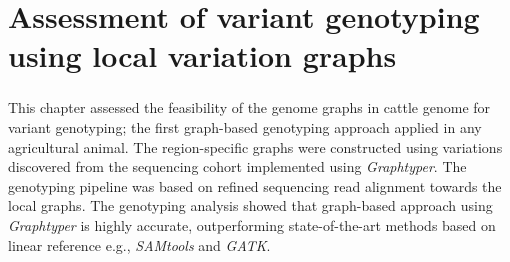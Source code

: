 \documentclass[11 pt, a4paper, notitlepage, twoside]{report}
\begin{document}
\iftwoside
\cleardoublepage
\newpage
\fi


\chapter[Feasibility of the bovine genome graphs]{\LARGE{Assessment of variant genotyping using local variation graphs}}
\label{chap:locgraph}
\subsection*{}
\onehalfspacing
\normalsize
This chapter assessed the feasibility of the genome graphs in cattle genome for variant genotyping; the first graph-based genotyping approach applied in any agricultural animal. The region-specific graphs were constructed using variations discovered from the sequencing cohort implemented using \emph{Graphtyper}. The genotyping pipeline was based on refined sequencing read alignment towards the local graphs. The genotyping analysis showed that graph-based approach using \textit{Graphtyper} is highly accurate, outperforming state-of-the-art methods based on linear reference e.g., \textit{SAMtools} and \emph{GATK}. \\

\bigskip


\begin{center}\end{center}
\end{document}
